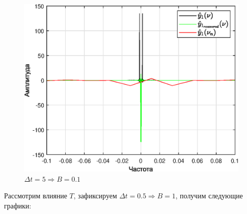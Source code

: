 \documentclass[a4paper]{article}
\begin{document}
\begin{figure}[H]
    \centering
    \includegraphics[width=0.55\linewidth]{graphs2/T_50_dt_5_B_0.1_dv_0.02/func1_image.eps}
    \caption{$\Delta t = 5 \Rightarrow B = 0.1$}
\end{figure}

Рассмотрим влияние $T$, зафиксируем $\Delta t = 0.5 \Rightarrow B = 1$, получим следующие графики:
\end{document}
